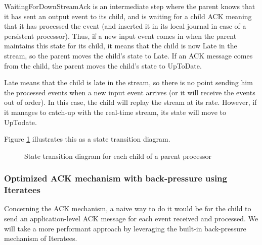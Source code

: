 WaitingForDownStreamAck is an intermediate step where the parent knows that it has sent an output event to its child, and is waiting for a child ACK meaning that it has
processed the event (and inserted it in its local journal in case of a persistent processor). Thus, if a new input event comes in when the parent maintains this state
for its child, it means that the child is now Late in the stream, so the parent moves the child's state to Late. If an ACK message comes from the child, the parent moves the
child's state to UpToDate.

Late means that the child is late in the stream, so there is no point sending him the processed events when a new input event arrives (or it will receive the events out of order).
In this case, the child will replay the stream at its rate. However, if it manages to catch-up with the real-time stream, its state will move to UpTodate.

Figure \ref{fig:childstates} illustrates this as a state transition diagram.

\begin{figure}[h]
  \begin{center} 
    \caption{State transition diagram for each child of a parent processor}
    \label{fig:childstates}
  \end{center}
\end{figure}

\subsubsection{Optimized ACK mechanism with back-pressure using Iteratees}

Concerning the ACK mechanism, a naive way to do it would be for the child to send an application-level ACK message for each event received and processed. We will take
a more performant approach by leveraging the built-in back-pressure mechanism of Iteratees. 

